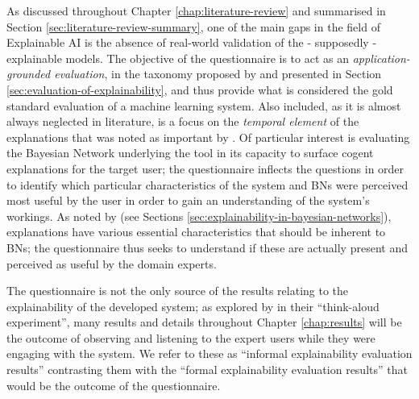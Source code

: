As discussed throughout Chapter \ref{chap:literature-review} and summarised in Section \ref{sec:literature-review-summary}, one of the main gaps in the field of Explainable AI is the absence of real-world validation of the - supposedly - explainable models.
The objective of the questionnaire is to act as an \textit{application-grounded evaluation}, in the taxonomy proposed by \citet{doshi2017towards} and presented in Section \ref{sec:evaluation-of-explainability}, and thus provide what is considered the gold standard evaluation of a machine learning system.
Also included, as it is almost always neglected in literature, is a focus on the \textit{temporal element} of the explanations that was noted as important by \citet{gilpin2018explaining}.
Of particular interest is evaluating the Bayesian Network underlying the tool in its capacity to surface cogent explanations for the target user; the questionnaire inflects the questions in order to identify which particular characteristics of the system and BNs were perceived most useful by the user in order to gain an understanding of the system's workings.
As noted by \citet{miller2018explanation} (see Sections \ref{sec:explainability-in-bayesian-networks}), explanations have various essential characteristics that should be inherent to BNs; the questionnaire thus seeks to understand if these are actually present and perceived as useful by the domain experts.

The questionnaire is not the only source of the results relating to the explainability of the developed system; as explored by \citet{stumpf2009interacting} in their \enquote{think-aloud experiment}, many results and details throughout Chapter \ref{chap:results} will be the outcome of observing and listening to the expert users while they were engaging with the system.
We refer to these as \enquote{informal explainability evaluation results} contrasting them with the \enquote{formal explainability evaluation results} that would be the outcome of the questionnaire.